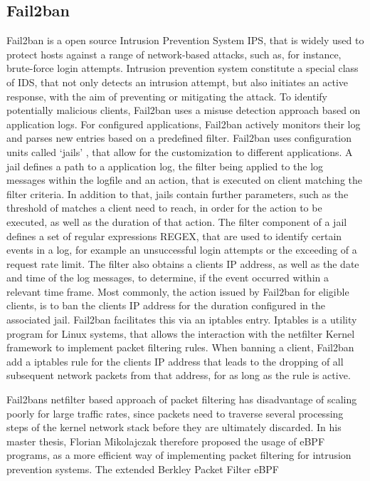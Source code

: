 \subsection{Fail2ban}
\label{sec:fail2ban}

Fail2ban is a open source Intrusion Prevention System \ac{IPS}, that is widely used to protect hosts against a range of network-based attacks, such as, for instance, brute-force login attempts\cite{fail2ban}. Intrusion prevention system constitute
a special class of \ac{IDS}, that not only detects an intrusion attempt, but also initiates an active response, with the aim of preventing or mitigating the attack. To identify potentially malicious clients,
Fail2ban uses a misuse detection approach based on application logs. For configured applications, Fail2ban actively monitors their log and parses new entries based on a predefined filter. Fail2ban uses configuration units called `jails'  
, that allow for the customization to different applications. A jail defines a path to a application log, the filter being applied to the log messages within the logfile and an action, that
is executed on client matching the filter criteria. In addition to that, jails contain further parameters, such as the threshold of matches a client need to reach, in order for the action to be executed,
as well as the duration of that action. The filter component of a jail defines a set of regular expressions \ac{REGEX}, that are used to identify certain events in a log, for example an unsuccessful login attempts or the 
exceeding of a request rate limit. The filter also obtains a clients IP address, as well as the date and time of the log messages, to determine, if the event occurred within a relevant time frame. 
Most commonly, the action issued by Fail2ban for eligible clients, is to ban the clients IP address for the duration configured in the associated jail. Fail2ban facilitates this via an iptables entry. 
Iptables is a utility program for Linux systems, that allows the interaction with the netfilter Kernel framework to implement packet filtering rules. When banning a client, Fail2ban add a iptables rule for the clients IP address that leads 
to the dropping of all subsequent network packets from that address, for as long as the rule is active.
\par
Fail2bans netfilter based approach of packet filtering has disadvantage of scaling poorly for large traffic rates, since packets need to traverse several processing steps of the kernel network stack before they are ultimately discarded.
In his master thesis, Florian Mikolajczak therefore proposed the usage of eBPF programs, as a more efficient way of implementing packet filtering for intrusion prevention systems\cite{mikolajczak2022}. The extended Berkley Packet Filter \ac{eBPF}      

